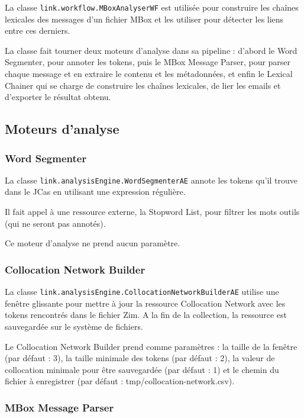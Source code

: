 \documentclass[a4paper]{article}
\begin{document}
La classe \texttt{link.workflow.MBoxAnalyserWF} est utilisée pour construire les chaînes lexicales des messages d'un fichier MBox et les utiliser pour détecter les liens entre ces derniers.

La classe fait tourner deux moteurs d'analyse dans sa pipeline : d'abord le Word Segmenter, pour annoter les tokens, puis le MBox Message Parser, pour parser chaque message et en extraire le contenu et les métadonnées, et enfin le Lexical Chainer qui se charge de construire les chaînes lexicales, de lier les emails et d'exporter le résultat obtenu.

\subsection{Moteurs d'analyse}

\subsubsection{Word Segmenter}
	
La classe \texttt{link.analysisEngine.WordSegmenterAE} annote les tokens qu'il trouve dans le JCas en utilisant une expression régulière.

Il fait appel à une ressource externe, la Stopword List, pour filtrer les mots outils (qui ne seront pas annotés).

Ce moteur d'analyse ne prend aucun paramètre.

\subsubsection{Collocation Network Builder}

La classe \texttt{link.analysisEngine.CollocationNetworkBuilderAE} utilise une fenêtre glissante pour mettre à jour la ressource Collocation Network avec les tokens rencontrés dans le fichier Zim. A la fin de la collection, la ressource est sauvegardée sur le système de fichiers.

Le Collocation Network Builder prend comme paramètres : la taille de la fenêtre (par défaut : 3), la taille minimale des tokens (par défaut : 2), la valeur de collocation minimale pour être sauvegardée (par défaut : 1) et le chemin du fichier à enregistrer (par défaut : tmp/collocation-network.csv).

\subsubsection{MBox Message Parser}
\end{document}
